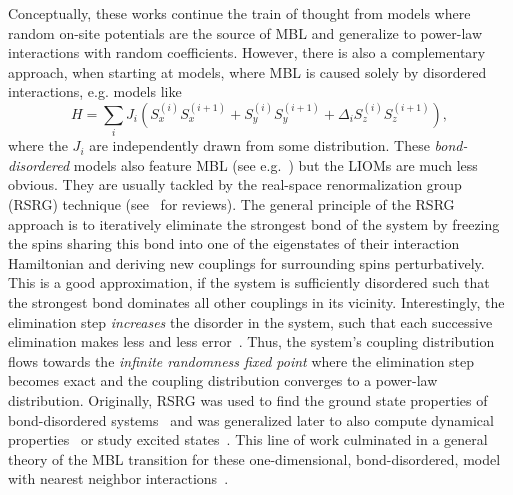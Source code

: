 

Conceptually, these works continue the train of thought from models where random on-site potentials are the source of MBL and generalize to power-law interactions with random coefficients. However, there is also a complementary approach, when starting at models, where MBL is caused solely by disordered interactions, e.g. models like
\begin{equation}\label{eq:bond-disordered-XXZ}
	H = \sum_{i} J_{i} \left(S_x^{(i)}S_x^{(i+1)} + S_y^{(i)}S_y^{(i+1)} + \Delta_i S_z^{(i)}S_z^{(i+1)}\right),
\end{equation}
where the $J_{i}$ are independently drawn from some distribution. These \emph{bond-disordered} models also feature MBL (see e.g.~\cite{vasseurParticleholeSymmetryManybody2016}) but the LIOMs are much less obvious. They are usually tackled by the real-space renormalization group (RSRG) technique (see~\cite{igloiStrongDisorderRG2005,parameswaranEigenstatePhaseTransitions2017,igloiStrongDisorderRG2018,monthusStrongDisorderRenormalization2018} for reviews). 
The general principle of the RSRG approach is to iteratively eliminate the strongest bond of the system by freezing the spins sharing this bond into one of the eigenstates of their interaction Hamiltonian and deriving new couplings for surrounding spins perturbatively. This is a good approximation, if the system is sufficiently disordered such that the strongest bond dominates all other couplings in its vicinity. Interestingly, the elimination step \emph{increases} the disorder in the system, such that each successive elimination makes less and less error~\cite{fisherRandomAntiferromagneticQuantum1994}. Thus, the system's coupling distribution flows towards the \emph{infinite randomness fixed point} where the elimination step becomes exact and the coupling distribution converges to a power-law distribution. Originally, RSRG was used to find the ground state properties of bond-disordered systems~\cite{dasguptaLowtemperaturePropertiesRandom1980,bhattScalingStudiesHighly1982,fisherRandomTransverseField1992,fisherRandomAntiferromagneticQuantum1994,fisherCriticalBehaviorRandom1995} and was generalized later to also compute dynamical properties~\cite{voskManybodyLocalizationOne2013,voskDynamicalQuantumPhase2014,masonTimedependentRealspaceRenormalizationGroup2019,ruggieroQuantumInformationSpreading2022} or study excited states~\cite{pekkerHilbertGlassTransitionNew2014,vasseurQuantumCriticalityHot2015,vasseurParticleholeSymmetryManybody2016}.
This line of work culminated in a general theory of the MBL transition for these one-dimensional, bond-disordered, model with nearest neighbor interactions~\cite{voskTheoryManyBodyLocalization2015}.

